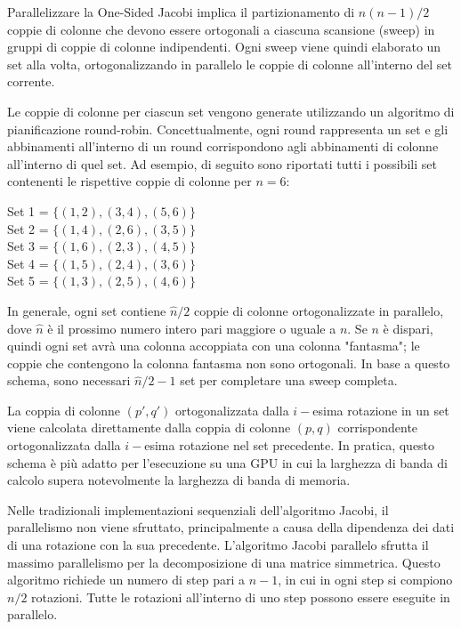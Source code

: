 Parallelizzare la One-Sided Jacobi implica il partizionamento di $n(n-1)/2$ coppie di colonne che devono essere ortogonali a ciascuna scansione (sweep) in gruppi di coppie di colonne indipendenti. Ogni sweep viene quindi elaborato un set alla volta, ortogonalizzando in parallelo le coppie di colonne all'interno del set corrente.

Le coppie di colonne per ciascun set vengono generate utilizzando un algoritmo di pianificazione round-robin. Concettualmente, ogni round rappresenta un set e gli abbinamenti all'interno di un round corrispondono agli abbinamenti di colonne all'interno di quel set. Ad esempio, di seguito sono riportati tutti i possibili set contenenti le rispettive coppie di colonne per $n = 6$:
\begin{center}
	Set 1 = $\{(1,2),(3,4),(5,6)\}$\\
	Set 2 = $\{(1,4),(2,6),(3,5)\}$\\
	Set 3 = $\{(1,6),(2,3),(4,5)\}$\\
	Set 4 = $\{(1,5),(2,4),(3,6)\}$\\
	Set 5 = $\{(1,3),(2,5),(4,6)\}$\\
\end{center}
In generale, ogni set contiene $\hat{n}/2$ coppie di colonne ortogonalizzate in parallelo, dove $\hat{n}$ è il prossimo numero intero pari maggiore o uguale a $n$. Se $n$ è dispari, quindi ogni set avrà una colonna accoppiata con una colonna "fantasma"; le coppie che contengono la colonna fantasma non sono ortogonali. In base a questo schema, sono necessari $\hat{n}/2 - 1$ set per completare una sweep completa.

La coppia di colonne $(p', q')$ ortogonalizzata dalla $i-$esima rotazione in un set viene calcolata direttamente dalla coppia di colonne $(p, q)$ corrispondente ortogonalizzata dalla $i-$esima rotazione nel set precedente. In pratica, questo schema è più adatto per l'esecuzione su una GPU in cui la larghezza di banda di calcolo supera notevolmente la larghezza di banda di memoria. \cite{Romer:SVD}

Nelle tradizionali implementazioni sequenziali dell'algoritmo Jacobi, il parallelismo non viene sfruttato, principalmente a causa della dipendenza dei dati di una rotazione con la sua precedente. L'algoritmo Jacobi parallelo sfrutta il massimo parallelismo per la decomposizione di una matrice simmetrica. Questo algoritmo richiede un numero di step pari a $n - 1$, in cui in ogni step si compiono $n/2$ rotazioni. Tutte le rotazioni all'interno di uno step possono essere eseguite in parallelo. \cite{Acosta:SVD}

